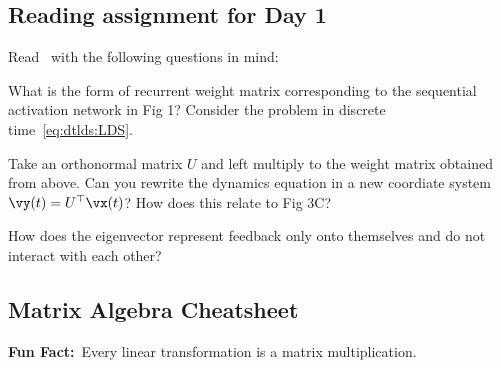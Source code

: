 \documentclass[a4paper,11pt]{exam}
\newcounter{ct}
\newcommand{\trp}{{^\top}} %
\newcommand{\funfact}{\textbf{Fun Fact:}~}
\begin{document}
\begin{questions}
\subsection{Reading assignment for Day 1}
Read~\citet{Goldman2009} with the following questions in mind:

\question What is the form of recurrent weight matrix corresponding to the sequential activation network in Fig 1? Consider the problem in discrete time~\eqref{eq:dtlds:LDS}.

\question Take an orthonormal matrix $U$ and left multiply to the weight matrix obtained from above. Can you rewrite the dynamics equation in a new coordiate system $\vy(t) = U\trp\vx(t)$? How does this relate to Fig 3C?

\question How does the eigenvector represent feedback only onto themselves and do not interact with each other?

\subsection{Matrix Algebra Cheatsheet}
\begin{tcolorbox}
\funfact Every linear transformation is a matrix multiplication.
\end{tcolorbox}


\end{questions}
\end{document}
